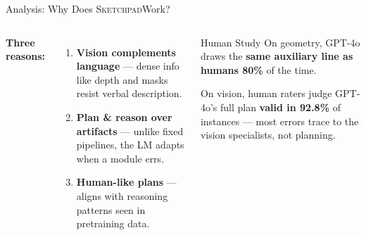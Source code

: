 \documentclass[aspectratio=169]{beamer}
\newcommand{\name}{\textsc{Sketchpad}}
\begin{document}
\begin{frame}{Analysis: Why Does \name Work?}
  \begin{columns}
    \textbf{\textcolor{sharifblue}{Three reasons:}}
    \begin{enumerate}
      \setlength{\itemsep}{0.3cm}
      \item \textbf{Vision complements language} --- dense info like depth
            and masks resist verbal description.
      \item \textbf{Plan \& reason over artifacts} --- unlike fixed pipelines,
            the LM adapts when a module errs.
      \item \textbf{Human-like plans} --- aligns with reasoning patterns seen
            in pretraining data.
    \end{enumerate}
    \begin{block}{Human Study}
      On geometry, GPT-4o draws the \textbf{same auxiliary line as humans
      80\%} of the time.
      \vspace{0.2cm}

      On vision, human raters judge GPT-4o's full plan \textbf{valid in
      92.8\%} of instances --- most errors trace to the vision specialists,
      not planning.
    \end{block}
  \end{columns}
\end{frame}
\end{document}
